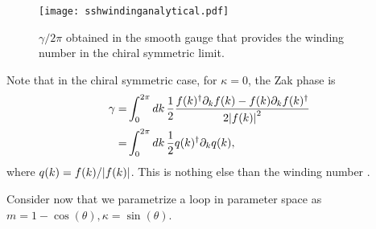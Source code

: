 \documentclass[twocolumn,amsmath,longbibliography,amssymb,superscriptaddress]{revtex4-1}
\begin{document}
\begin{figure}[t]
	\centering
	\texttt{[image: sshwindinganalytical.pdf]}
	\caption{$\gamma/2\pi$ obtained in the smooth gauge that provides the winding number in the chiral symmetric limit.}
	\label{fig:ssh_zak}
\end{figure}

Note that in the chiral symmetric case, for $\kappa = 0$, the Zak phase is
\begin{align*}
\gamma =& \int_0^{2\pi} dk\,\frac{1}{2}\frac{f(k)^\dagger \partial_k f(k)-f(k)\partial_k f(k)^\dagger}{2\abs{f(k)}^2} \\
=& \int_0^{2\pi} dk\,\frac{1}{2}q(k)^\dagger \partial_k q(k),
\end{align*}
where $q(k) = f(k)/\abs{f(k)}$. This is nothing else than the winding number \cite{ryu2010topological}. 

Consider now that we parametrize a loop in parameter space as $m=1-\cos(\theta),\kappa = \sin(\theta)$.
\end{document}
